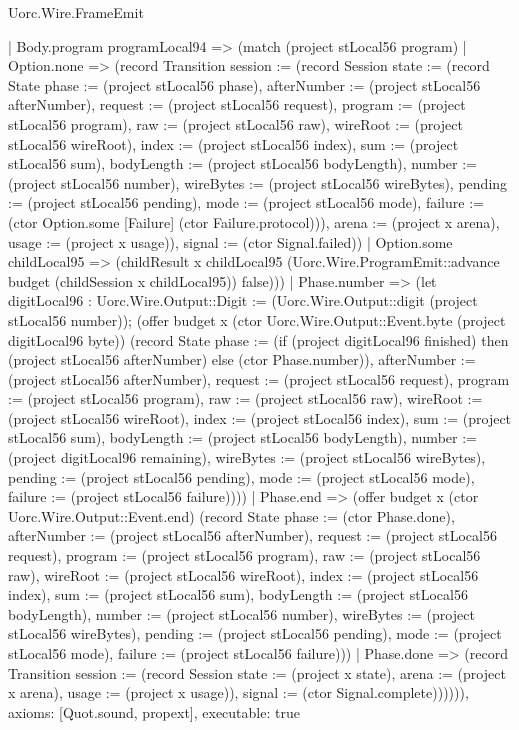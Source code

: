 \begin{lexlean}{Uorc.Wire.FrameEmit}
\begin{semanticmodule}
{          | Body.program programLocal94 => (match (project stLocal56 program)
            | Option.none => (record Transition {session := (record Session {state := (record State {phase := (project stLocal56 phase), afterNumber := (project stLocal56 afterNumber), request := (project stLocal56 request), program := (project stLocal56 program), raw := (project stLocal56 raw), wireRoot := (project stLocal56 wireRoot), index := (project stLocal56 index), sum := (project stLocal56 sum), bodyLength := (project stLocal56 bodyLength), number := (project stLocal56 number), wireBytes := (project stLocal56 wireBytes), pending := (project stLocal56 pending), mode := (project stLocal56 mode), failure := (ctor Option.some [Failure] (ctor Failure.protocol))}), arena := (project x arena), usage := (project x usage)}), signal := (ctor Signal.failed)})
            | Option.some childLocal95 => (childResult x childLocal95 (Uorc.Wire.ProgramEmit::advance budget (childSession x childLocal95)) false)))
        | Phase.number => (let digitLocal96 : Uorc.Wire.Output::Digit := (Uorc.Wire.Output::digit (project stLocal56 number)); (offer budget x (ctor Uorc.Wire.Output::Event.byte (project digitLocal96 byte)) (record State {phase := (if (project digitLocal96 finished) then (project stLocal56 afterNumber) else (ctor Phase.number)), afterNumber := (project stLocal56 afterNumber), request := (project stLocal56 request), program := (project stLocal56 program), raw := (project stLocal56 raw), wireRoot := (project stLocal56 wireRoot), index := (project stLocal56 index), sum := (project stLocal56 sum), bodyLength := (project stLocal56 bodyLength), number := (project digitLocal96 remaining), wireBytes := (project stLocal56 wireBytes), pending := (project stLocal56 pending), mode := (project stLocal56 mode), failure := (project stLocal56 failure)})))
        | Phase.end => (offer budget x (ctor Uorc.Wire.Output::Event.end) (record State {phase := (ctor Phase.done), afterNumber := (project stLocal56 afterNumber), request := (project stLocal56 request), program := (project stLocal56 program), raw := (project stLocal56 raw), wireRoot := (project stLocal56 wireRoot), index := (project stLocal56 index), sum := (project stLocal56 sum), bodyLength := (project stLocal56 bodyLength), number := (project stLocal56 number), wireBytes := (project stLocal56 wireBytes), pending := (project stLocal56 pending), mode := (project stLocal56 mode), failure := (project stLocal56 failure)}))
        | Phase.done => (record Transition {session := (record Session {state := (project x state), arena := (project x arena), usage := (project x usage)}), signal := (ctor Signal.complete)}))))),
  axioms: [Quot.sound, propext],
  executable: true
}


\end{semanticmodule}
\end{lexlean}

